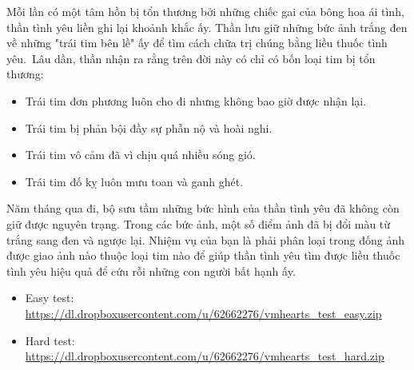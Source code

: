 Mỗi lần có một tâm hồn bị tổn thương bởi những chiếc gai của bông hoa ái tình, thần tình yêu liền ghi lại khoảnh khắc ấy. Thần lưu giữ những bức ảnh trắng đen về những "trái tim bên lề" ấy để tìm cách chữa trị chúng bằng liều thuốc tình yêu. Lâu dần, thần nhận ra rằng trên đời này có chỉ có bốn loại tim bị tổn thương:
\begin{itemize}
	\item Trái tim đơn phương luôn cho đi nhưng không bao giờ được nhận lại. 
	\item Trái tim bị phản bội đầy sự phẫn nộ và hoài nghi.
	\item Trái tim vô cảm đã vì chịu quá nhiều sóng gió.
	\item Trái tim đố kỵ luôn mưu toan và ganh ghét.  
\end{itemize}

Năm tháng qua đi, bộ sưu tầm những bức hình của thần tình yêu đã không còn giữ được nguyên trạng. Trong các bức ảnh, một số điểm ảnh đã bị đổi màu từ trắng sang đen và ngược lại. Nhiệm vụ của bạn là phải phân loại trong đống ảnh được giao ảnh nào thuộc loại tim nào để giúp thần tình yêu tìm được liều thuốc tình yêu hiệu quả để cứu rỗi những con người bất hạnh ấy. 
\begin{itemize}
	\item Easy test: \href{https://dl.dropboxusercontent.com/u/62662276/vmhearts_test_easy.zip}{https://dl.dropboxusercontent.com/u/62662276/vmhearts\_test\_easy.zip}
	\item Hard test: \href{https://dl.dropboxusercontent.com/u/62662276/vmhearts_test_hard.zip}{https://dl.dropboxusercontent.com/u/62662276/vmhearts\_test\_hard.zip}
\end{itemize}